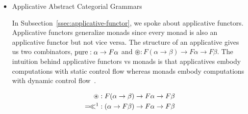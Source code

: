 \begin{itemize}
  $$
  \sem{\ap{\abs{who}_{\abs{s}}}{\textsf{k}}} = \lam{x}{\begin{aligned}[t]
      &\ap{\textsf{k}}{x} \hsbind (\lam{p}{ \\
      &\app{\op{implicate}}{p}{(\lam{\_}{ \\
      &\etaE{x}})}})
    \end{aligned}}
  $$

  While the conservativity result of de Groote lets us be confident when
  porting a grammar to a different type of interpretation, it does not help
  us when extending it with new entries. It is this problem that is
  addressed by the techniques presented here and in the works of Simon
  Charlow. Specifically, in our setting, we do not view the different
  phenomena in a language as forming a hierarchy in which one extends the
  other.\footnote{There are exceptions, such as our treatment of
    presuppositions, which extends our treatment of dynamics.} Instead, it
  is the case that any lexical entry can use any subset of the phenomena it
  needs. For example, \emph{she} is anaphoric but not quantificational,
  \emph{every man} is quantificational but not anaphoric, \emph{you} is
  neither anaphoric nor quantificational but deictic, \emph{your husband}
  is both deictic and presuppositional but not quantificational\ldots
 

\item Applicative Abstract Categorial
  Grammars~\cite{kiselyov2015applicative,kiselyov2015swing}

  In Subsection~\ref{ssec:applicative-functor}, we spoke about applicative
  functors. Applicative functors generalize monads since every monad is
  also an applicative functor but not vice versa. The structure of an
  applicative gives us two combinators, $\operatorname{pure} : \alpha \to F \alpha$ and
  $\circledast : F (\alpha \to \beta) \to F \alpha \to F \beta$. The
  intuition behind applicative functors vs monads is that applicatives
  embody computations with static control flow whereas monads embody
  computations with dynamic control flow~\cite{lindley2014algebraic}.

  \begin{align*}
    \circledast &: F (\alpha \to \beta) \to F \alpha \to F \beta \\
    \revhsbind\footnotemark &: (\alpha \to F \beta) \to F \alpha \to F \beta
  \end{align*}



\end{itemize}
